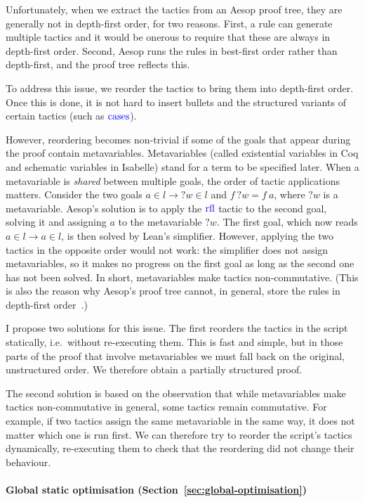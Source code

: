 \documentclass[sigplan,10pt,anonymous,review]{acmart}
\newcommand{\tac}[1]{\ensuremath{\mathrm{\mathcolor{blue}{#1}}}}
\newcommand{\mvar}[1]{{?#1}}
\begin{document}
Unfortunately, when we extract the tactics from an Aesop proof tree, they are generally not in depth-first order, for two reasons.
First, a rule can generate multiple tactics and it would be onerous to require that these are always in depth-first order.
Second, Aesop runs the rules in best-first order rather than depth-first, and the proof tree reflects this.

To address this issue, we reorder the tactics to bring them into depth-first order.
Once this is done, it is not hard to insert bullets and the structured variants of certain tactics (such as \tac{cases}).

However, reordering becomes non-trivial if some of the goals that appear during the proof contain metavariables.
Metavariables (called existential variables in Coq and schematic variables in Isabelle) stand for a term to be specified later.
When a metavariable is \emph{shared} between multiple goals, the order of tactic applications matters.
Consider the two goals $a ∈ l → \mvar{w} ∈ l$ and $f~\mvar{w} = f~a$, where $\mvar{w}$ is a metavariable.
Aesop's solution is to apply the \tac{rfl} tactic to the second goal, solving it and assigning $a$ to the metavariable $\mvar{w}$.
The first goal, which now reads $a ∈ l → a ∈ l$, is then solved by Lean's simplifier.
However, applying the two tactics in the opposite order would not work: the simplifier does not assign metavariables, so it makes no progress on the first goal as long as the second one has not been solved.
In short, metavariables make tactics non-commutative.
(This is also the reason why Aesop's proof tree cannot, in general, store the rules in depth-first order~\cite[Section~4]{Aesop}.)

I propose two solutions for this issue.
The first reorders the tactics in the script statically, i.e.\ without re-executing them.
This is fast and simple, but in those parts of the proof that involve metavariables we must fall back on the original, unstructured order.
We therefore obtain a partially structured proof.

The second solution is based on the observation that while metavariables make tactics non-commutative in general, some tactics remain commutative.
For example, if two tactics assign the same metavariable in the same way, it does not matter which one is run first.
We can therefore try to reorder the script's tactics dynamically, re-executing them to check that the reordering did not change their behaviour.

\paragraph{Global static optimisation (Section~\ref{sec:global-optimisation})}
\end{document}
